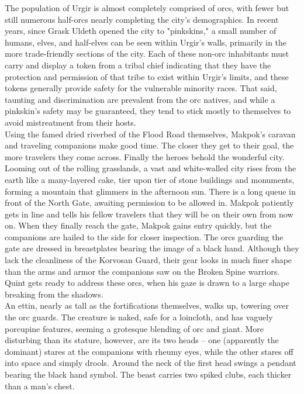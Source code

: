The population of Urgir is almost completely comprised of orcs, with fewer but still numerous half-orcs nearly completing the city's demographics. In recent years, since Grask Uldeth opened the city to "pinkskins," a small number of humans, elves, and half-elves can be seen within Urgir's walls, primarily in the more trade-friendly sections of the city. Each of these non-orc inhabitants must carry and display a token from a tribal chief indicating that they have the protection and permission of that tribe to exist within Urgir's limits, and these tokens generally provide safety for the vulnerable minority races. That said, taunting and discrimination are prevalent from the orc natives, and while a pinkskin's safety may be guaranteed, they tend to stick mostly to themselves to avoid mistreatment from their hosts.\\

Using the famed dried riverbed of the Flood Road themselves, Makpok's caravan and traveling companions make good time. The closer they get to their goal, the more travelers they come across. Finally the heroes behold the wonderful city. Looming out of the rolling grasslands, a vast and white-walled city rises from the earth like a many-layered cake, tier upon tier of stone buildings and monuments, forming a mountain that glimmers in the afternoon sun. There is a long queue in front of the North Gate, awaiting permission to be allowed in. Makpok patiently gets in line and tells his fellow travelers that they will be on their own from now on. When they finally reach the gate, Makpok gains entry quickly, but the companions are hailed to the side for closer inspection. The orcs guarding the gate are dressed in breastplates bearing the image of a black hand. Although they lack the cleanliness of the Korvosan Guard, their gear looks in much finer shape than the arms and armor the companions saw on the Broken Spine warriors. Quint gets ready to address these orcs, when his gaze is drawn to a large shape breaking from the shadows.\\

An ettin, nearly as tall as the fortifications themselves, walks up, towering over the orc guards. The creature is naked, safe for a loincloth, and has vaguely porcupine features, seeming a grotesque blending of orc and giant. More disturbing than its stature, however, are its two heads -- one (apparently the dominant) stares at the companions with rheumy eyes, while the other stares off into  space and simply drools. Around the neck of the first head swings a pendant bearing the black hand symbol. The beast carries two spiked clubs, each thicker than a man's chest.\\

